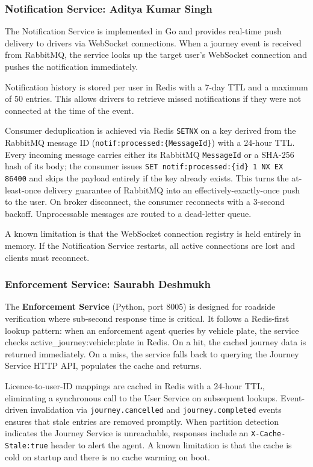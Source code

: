 \documentclass[12pt,a4paper]{article}
\begin{document}
\subsubsection{Notification Service: Aditya Kumar Singh}
 
The Notification Service is implemented in Go and provides real-time push delivery to drivers via WebSocket connections. When a journey event is received from RabbitMQ, the service looks up the target user's WebSocket connection and pushes the notification immediately.
 
Notification history is stored per user in Redis with a 7-day TTL and a maximum of 50 entries. This allows drivers to retrieve missed notifications if they were not connected at the time of the event.
 
Consumer deduplication is achieved via Redis \texttt{SETNX} on a key derived from the RabbitMQ message ID (\texttt{notif:processed:\{MessageId\}}) with a 24-hour TTL. Every incoming message carries either its RabbitMQ \texttt{MessageId} or a SHA-256 hash of its body; the consumer issues \texttt{SET notif:processed:\{id\} 1 NX EX 86400} and skips the payload entirely if the key already exists. This turns the at-least-once delivery guarantee of RabbitMQ into an effectively-exactly-once push to the user. On broker disconnect, the consumer reconnects with a 3-second backoff. Unprocessable messages are routed to a dead-letter queue.
 
A known limitation is that the WebSocket connection registry is held entirely in memory. If the Notification Service restarts, all active connections are lost and clients must reconnect.
 
\subsubsection{Enforcement Service: Saurabh Deshmukh}
 
The \textbf{Enforcement Service} (Python, port 8005) is designed for roadside verification where sub-second response time is critical. It follows a Redis-first lookup pattern: when an enforcement agent queries by vehicle plate, the service checks active\_journey:vehicle:plate in Redis. On a hit, the cached journey data is returned immediately. On a miss, the service falls back to querying the Journey Service HTTP API, populates the cache and returns.

Licence-to-user-ID mappings are cached in Redis with a 24-hour TTL, eliminating a synchronous call to the User Service on subsequent lookups. Event-driven invalidation via \texttt{journey.cancelled} and \texttt{journey.completed} events ensures that stale entries are removed promptly. When partition detection indicates the Journey Service is unreachable, responses include an \texttt{X-Cache-Stale:true} header to alert the agent. A known limitation is that the cache is cold on startup and there is no cache warming on boot.
 
\end{document}
